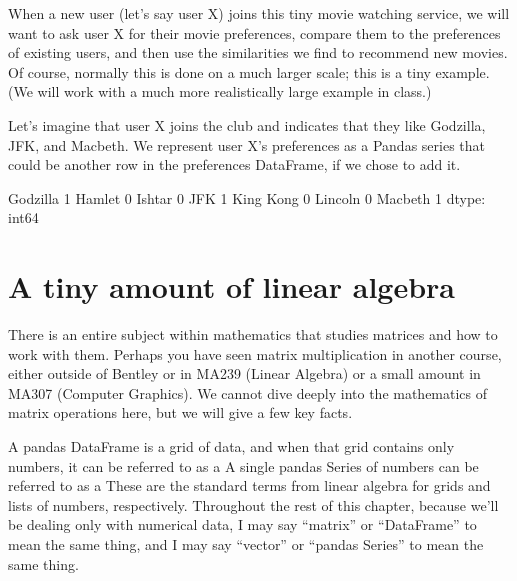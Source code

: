 \documentclass[letterpaper,10pt,english]{jupyterBook}
\begin{document}
\sphinxAtStartPar
When a new user (let’s say user X) joins this tiny movie watching service, we will want to ask user X for their movie preferences, compare them to the preferences of existing users, and then use the similarities we find to recommend new movies.  Of course, normally this is done on a much larger scale; this is a tiny example.  (We will work with a much more realistically large example in class.)

\sphinxAtStartPar
Let’s imagine that user X joins the club and indicates that they like Godzilla, JFK, and Macbeth.  We represent user X’s preferences as a Pandas series that could be another row in the preferences DataFrame, if we chose to add it.

\begin{sphinxVerbatim}[commandchars=\\\{\}]
   \PYG{p}{[}  \PYG{p}{]}  
\end{sphinxVerbatim}

\begin{sphinxVerbatim}[commandchars=\\\{\}]
Godzilla     1
Hamlet       0
Ishtar       0
JFK          1
King Kong    0
Lincoln      0
Macbeth      1
dtype: int64
\end{sphinxVerbatim}


\section{A tiny amount of linear algebra}
\label{\detokenize{chapter-16-matrices:a-tiny-amount-of-linear-algebra}}
\sphinxAtStartPar
There is an entire subject within mathematics that studies matrices and how to work with them.  Perhaps you have seen matrix multiplication in another course, either outside of Bentley or in MA239 (Linear Algebra) or a small amount in MA307 (Computer Graphics).  We cannot dive deeply into the mathematics of matrix operations here, but we will give a few key facts.

\sphinxAtStartPar
A pandas DataFrame is a grid of data, and when that grid contains only numbers, it can be referred to as a   A single pandas Series of numbers can be referred to as a   These are the standard terms from linear algebra for grids and lists of numbers, respectively.  Throughout the rest of this chapter, because we’ll be dealing only with numerical data, I may say “matrix” or “DataFrame” to mean the same thing, and I may say “vector” or “pandas Series” to mean the same thing.
\end{document}

